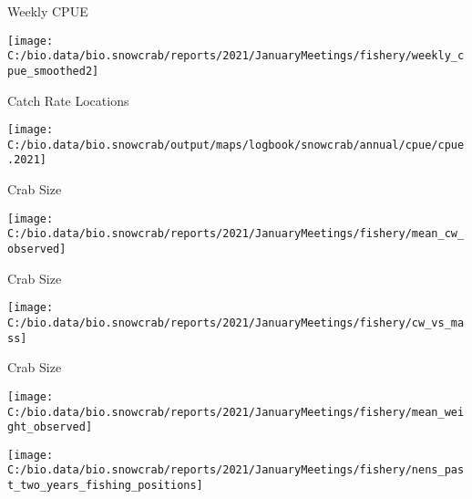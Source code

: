 \documentclass[
  ignorenonframetext,
]{beamer}
\begin{document}
\begin{frame}{Weekly CPUE}
\protect\hypertarget{weekly-cpue}{}
\begin{center}\texttt{[image: C:/bio.data/bio.snowcrab/reports/2021/JanuaryMeetings/fishery/weekly\_cpue\_smoothed2]} \end{center}
\end{frame}

\begin{frame}{Catch Rate Locations}
\protect\hypertarget{catch-rate-locations}{}
\begin{center}\texttt{[image: C:/bio.data/bio.snowcrab/output/maps/logbook/snowcrab/annual/cpue/cpue.2021]} \end{center}
\end{frame}

\begin{frame}{Crab Size}
\protect\hypertarget{crab-size}{}
\begin{center}\texttt{[image: C:/bio.data/bio.snowcrab/reports/2021/JanuaryMeetings/fishery/mean\_cw\_observed]} \end{center}
\end{frame}

\begin{frame}{Crab Size}
\protect\hypertarget{crab-size-1}{}
\begin{center}\texttt{[image: C:/bio.data/bio.snowcrab/reports/2021/JanuaryMeetings/fishery/cw\_vs\_mass]} \end{center}
\end{frame}

\begin{frame}{Crab Size}
\protect\hypertarget{crab-size-2}{}
\begin{center}\texttt{[image: C:/bio.data/bio.snowcrab/reports/2021/JanuaryMeetings/fishery/mean\_weight\_observed]} \end{center}
\end{frame}

\begin{frame}
\begin{center}\texttt{[image: C:/bio.data/bio.snowcrab/reports/2021/JanuaryMeetings/fishery/nens\_past\_two\_years\_fishing\_positions]} \end{center}
\end{frame}
\end{document}
